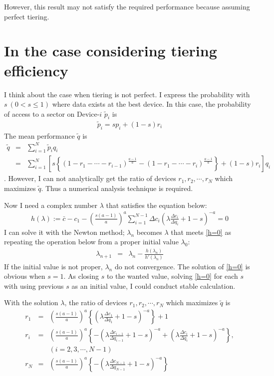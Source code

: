 \documentclass[a4paper,11pt]{article}
\begin{document}
However, this result may not satisfy the required performance because assuming perfect tiering.

\section{In the case considering tiering efficiency}

I think about the case when tiering is not perfect.
I express the probability with $s\ (0 < s\leq 1)$ where data exists at the best device. In this case, the probability of access to a sector on Device-$i$ $\tilde{p}_i$ is
\begin{eqnarray}
\tilde{p}_i = sp_i + (1-s)r_i
\end{eqnarray}
The mean performance $\tilde{q}$ is 
\begin{eqnarray}
\tilde{q} &=& \sum_{i=1}^N\tilde{p}_i q_i \nonumber\\
&=& \sum_{i=1}^N \left[s \left\{
 \left(1-r_1-\cdots-r_{i-1}\right)^\frac{a-1}{a}-\left(1-r_1-\cdots-r_i\right)^\frac{a-1}{a}
\right\}
 + (1-s) r_i\right] q_i
\end{eqnarray}
. However, I can not analytically get the ratio of devices $r_1,r_2,\cdots,r_N$ which maximizes $\tilde{q}$. Thus a numerical analysis technique is required.

Now I need a complex number $\lambda$ that satisfies the equation below:
\begin{eqnarray}
h(\lambda) :=
\bar{c}-c_1 - \left(\frac{s(a-1)}{a}\right)^{a}
\sum_{i=1}^{N-1}\Delta c_i \left(
\lambda\frac{\Delta c_i}{\Delta q_i} + 1-s
\right)^{-a} =
0 \label{h=0} 
\end{eqnarray}
I can solve it with the Newton method;
$\lambda_n$ becomes $\lambda$ that meets \eqref{h=0} as repeating the operation below from a proper initial value $\lambda_0$:
\begin{eqnarray}
\lambda_{n+1} &=& \lambda_n - \frac{h(\lambda_n)}{h'(\lambda_n)}
\end{eqnarray}
If the initial value is not proper, $\lambda_n$ do not convergence.
The solution of \eqref{h=0} is obvious when $s = 1$. 
As closing $s$ to the wanted value, solving \eqref{h=0} for each $s$ with using previous $s$ as an initial value,
I could conduct stable calculation.

With the solution $\lambda$, the ratio of devices $r_1,r_2,\cdots,r_N$ which maximizes $\tilde{q}$ is
\begin{eqnarray}
r_1&=&\left(\frac{s(a-1)}{a}\right)^{a}
\left\{ 
     \left(\lambda\frac{\Delta c_1}{\Delta q_1}+1-s
    \right)^{-a}
\right\}+1 \label{r1_cs}\\
r_i&=&\left(\frac{s(a-1)}{a}\right)^{a}
\left\{ -
     \left(\lambda\frac{\Delta c_{i-1}}{\Delta q_{i-1}}+1-s
    \right)^{-a}
+     \left(\lambda\frac{\Delta c_i}{\Delta q_i}+1-s
    \right)^{-a}
\right\}, \nonumber \\
&& (i = 2, 3, \cdots, N-1)\label{ri_cs}\\
r_N&=&\left(\frac{s(a-1)}{a}\right)^{a}
\left\{-
    \left(\lambda\frac{\Delta c_{N-1}}{\Delta q_{N-1}}+1-s
    \right)^{-a}
\right\} \label{rN_cs}
\end{eqnarray}
\end{document}
